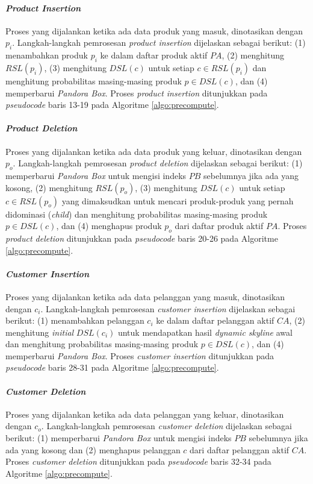 \documentclass[conference]{IEEEtran}
\begin{document}
\paragraph{\textbf{\textit{Product Insertion}}}
Proses yang dijalankan ketika ada data produk yang masuk, dinotasikan dengan $p_{i}$. Langkah-langkah pemrosesan \textit{product insertion} dijelaskan sebagai berikut: (1) menambahkan produk $p_{i}$ ke dalam daftar produk aktif $PA$, (2) menghitung $RSL(p_{i})$, (3) menghitung $DSL(c)$ untuk setiap $c \in RSL(p_{i})$ dan menghitung probabilitas masing-masing produk $p \in DSL(c)$, dan (4) memperbarui \textit{Pandora Box}. Proses \textit{product insertion} ditunjukkan pada \textit{pseudocode} baris 13-19 pada Algoritme \ref{algo:precompute}.

\paragraph{\textbf{\textit{Product Deletion}}}
Proses yang dijalankan ketika ada data produk yang keluar, dinotasikan dengan $p_{o}$. Langkah-langkah pemrosesan \textit{product deletion} dijelaskan sebagai berikut: (1) memperbarui \textit{Pandora Box} untuk mengisi indeks $PB$ sebelumnya jika ada yang kosong, (2) menghitung $RSL(p_{o})$, (3) menghitung $DSL(c)$ untuk setiap $c \in RSL(p_{o})$ yang dimaksudkan untuk mencari produk-produk yang pernah didominasi (\textit{child}) dan menghitung probabilitas masing-masing produk $p \in DSL(c)$, dan (4) menghapus produk $p_{o}$ dari daftar produk aktif $PA$. Proses \textit{product deletion} ditunjukkan pada \textit{pseudocode} baris 20-26 pada Algoritme \ref{algo:precompute}.

\paragraph{\textbf{\textit{Customer Insertion}}}
Proses yang dijalankan ketika ada data pelanggan yang masuk, dinotasikan dengan $c_{i}$. Langkah-langkah pemrosesan \textit{customer insertion} dijelaskan sebagai berikut: (1) menambahkan pelanggan $c_{i}$ ke dalam daftar pelanggan aktif $CA$, (2) menghitung \textit{initial} $DSL(c_{i})$ untuk mendapatkan hasil \textit{dynamic skyline} awal dan menghitung probabilitas masing-masing produk $p \in DSL(c)$, dan (4) memperbarui \textit{Pandora Box}. Proses \textit{customer insertion} ditunjukkan pada \textit{pseudocode} baris 28-31 pada Algoritme \ref{algo:precompute}.

\paragraph{\textbf{\textit{Customer Deletion}}}
Proses yang dijalankan ketika ada data pelanggan yang keluar, dinotasikan dengan $c_{o}$. Langkah-langkah pemrosesan \textit{customer deletion} dijelaskan sebagai berikut: (1) memperbarui \textit{Pandora Box} untuk mengisi indeks $PB$ sebelumnya jika ada yang kosong dan (2) menghapus pelanggan $c$ dari daftar pelanggan aktif $CA$. Proses \textit{customer deletion} ditunjukkan pada \textit{pseudocode} baris 32-34 pada Algoritme \ref{algo:precompute}.
\end{document}
